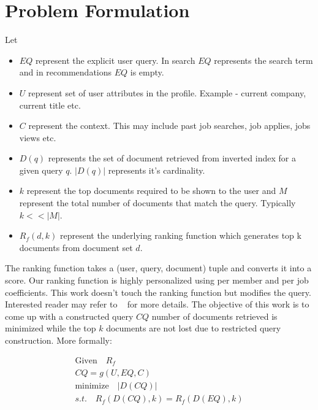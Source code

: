 \documentclass{sig-alternate-05-2015}
\begin{document}
\section{Problem Formulation}
Let
\begin{itemize}
    \item $EQ$ represent the explicit user query. In search $EQ$ represents the
        search term and in recommendations $EQ$ is empty.
    \item $U$ represent set of user attributes in the profile. Example -
        current company, current title etc.
    \item $C$ represent the context. This may include past job searches,
        job applies, jobs views etc.
    \item $D(q)$ represents the set of document retrieved from inverted index
        for a given query $q$. $|D(q)|$ represents it's cardinality.
    \item $k$ represent the top documents required to be shown to the user and
        $M$ represent the total number of documents that match the query.
        Typically $k << |M|$.
    \item $R_f(d, k)$ represent the underlying ranking function which generates
        top k documents from document set $d$.  

\end{itemize}
The ranking function takes a (user, query, document) tuple and converts it into a score. Our
ranking function is highly personalized using per member and per job
coefficients. This work doesn't touch the ranking function but modifies the query. 
Interested reader may refer to ~\cite{zhang2016glmix} for more details. The
objective of this work is to come up with a constructed query $CQ$
number of documents retrieved is minimized while the top $k$ documents are not
lost due to restricted query construction. More formally:

\begin{equation} \label{eq:problem-formulation}
    \begin{aligned}
        \textrm{Given} \quad R_f \\
    CQ = g(U, EQ, C) \\
        \textrm{minimize} \quad |D(CQ)| \\
        s. t. \quad  R_f(D(CQ), k) = R_f(D(EQ), k)
    \end{aligned}
\end{equation}
\end{document}
